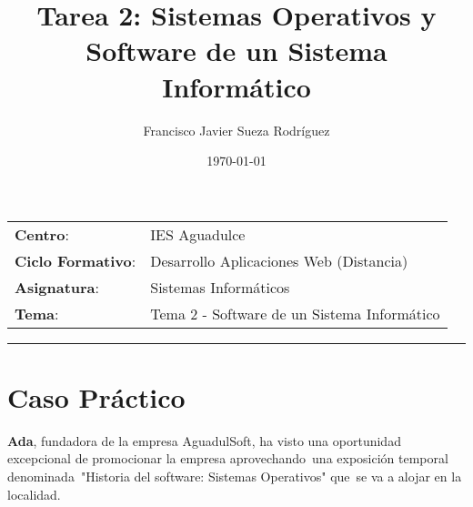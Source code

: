 


\title{
\vspace{10ex}
\normalfont \normalsize
\Huge \textbf{Tarea 2: Sistemas Operativos y Software de un Sistema Informático}
}
\author{Francisco Javier Sueza Rodríguez}
\date{\normalsize\today}



\maketitle

\thispagestyle{empty}

\vspace{68ex}

\begin{center}
    \begin{tabular}{l l}
        \textbf{Centro}: & IES Aguadulce \\
        \textbf{Ciclo Formativo}: & Desarrollo Aplicaciones Web (Distancia)\\
        \textbf{Asignatura}: & Sistemas Informáticos\\
        \textbf{Tema}: & Tema 2 -  Software de un Sistema Informático\\
    \end{tabular}
\end{center}

\newpage

\tableofcontents

\vspace{15ex}

\hrule

\vspace{10ex}

\listoffigures

\newpage

\section{Caso Práctico}
\textbf{Ada}, fundadora de la empresa AguadulSoft, ha visto una oportunidad excepcional de promocionar la empresa aprovechando una exposición temporal denominada "Historia del software: Sistemas Operativos" que se va a alojar en la localidad.

